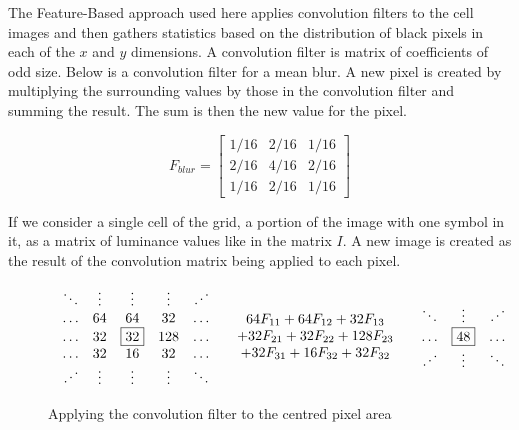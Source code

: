 The Feature-Based approach used here applies convolution filters to the
cell images and then gathers statistics based on the distribution of black
pixels in each of the $x$ and $y$ dimensions. A convolution filter is matrix
of coefficients of odd size. Below is a convolution filter for a mean blur.
A new pixel is created by multiplying the surrounding values by those in
the convolution filter and summing the result. The sum is then the new value
for the pixel.

\[ F_{blur} = \left[
\begin{array}{ccc}
1/16 & 2/16 & 1/16 \\
2/16 & 4/16 & 2/16 \\
1/16 & 2/16 & 1/16
\end{array}\right] \]

If we consider a single cell of the grid, a portion of the image with one symbol in it,
as a matrix of luminance values like in the matrix $I$. A new image is created as the
result of the convolution matrix being applied to each pixel.

\begin{figure}[h] \[
\begin{array}{lcr}
\begin{array}{ccccc}
\ddots & \vdots & \vdots & \vdots & \iddots \\
\ldots & 64 & 64 & 32 & \ldots \\
\ldots & 32 & \fbox{32} & 128 & \ldots \\
\ldots & 32 & 16 & 32 & \ldots \\
\iddots & \vdots & \vdots & \vdots & \ddots \\
\end{array} &
\begin{array}{c}
64F_{11} + 64F_{12} + 32F_{13} \\
+ 32F_{21} + 32F_{22} + 128F_{23} \\
+ 32F_{31} + 16F_{32} + 32F_{32} \\
\end{array} &
\begin{array}{ccccc}
\ddots & \vdots & \iddots \\
\ldots &  \fbox{48}  & \ldots \\
\iddots & \vdots & \ddots \\
\end{array}
\end{array} \]
\caption{Applying the convolution filter to the centred pixel area}
\end{figure}

